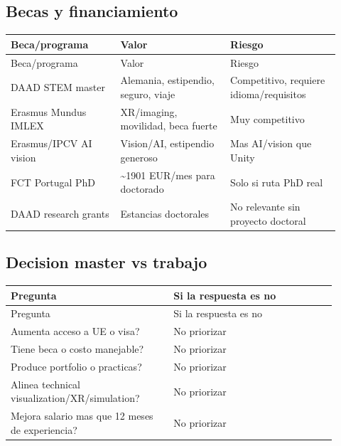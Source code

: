 \subsection{Becas y financiamiento}


\begin{center}
\scriptsize
\begin{longtable}{>{\raggedright\arraybackslash}p{0.305\linewidth} >{\raggedright\arraybackslash}p{0.305\linewidth} >{\raggedright\arraybackslash}p{0.305\linewidth}}
\toprule
Beca/programa & Valor & Riesgo \\
\midrule
\endfirsthead
\toprule
Beca/programa & Valor & Riesgo \\
\midrule
\endhead
DAAD STEM master & Alemania, estipendio, seguro, viaje & Competitivo, requiere idioma/requisitos \\
Erasmus Mundus IMLEX & XR/imaging, movilidad, beca fuerte & Muy competitivo \\
Erasmus/IPCV AI vision & Vision/AI, estipendio generoso & Mas AI/vision que Unity \\
FCT Portugal PhD & \textasciitilde{}1901 EUR/mes para doctorado & Solo si ruta PhD real \\
DAAD research grants & Estancias doctorales & No relevante sin proyecto doctoral \\
\bottomrule
\end{longtable}
\end{center}


\subsection{Decision master vs trabajo}


\begin{center}
\scriptsize
\begin{longtable}{>{\raggedright\arraybackslash}p{0.455\linewidth} >{\raggedright\arraybackslash}p{0.455\linewidth}}
\toprule
Pregunta & Si la respuesta es no \\
\midrule
\endfirsthead
\toprule
Pregunta & Si la respuesta es no \\
\midrule
\endhead
Aumenta acceso a UE o visa? & No priorizar \\
Tiene beca o costo manejable? & No priorizar \\
Produce portfolio o practicas? & No priorizar \\
Alinea technical visualization/XR/simulation? & No priorizar \\
Mejora salario mas que 12 meses de experiencia? & No priorizar \\
\bottomrule
\end{longtable}
\end{center}


